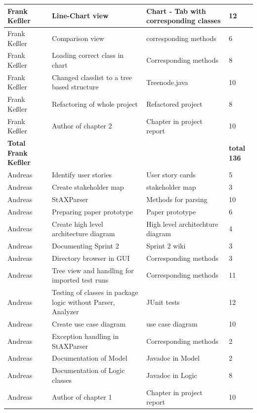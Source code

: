 \begin{longtable}{|p{}||p{}|p{}|p{}|}
    \hline
    Frank Keßler & Line-Chart view & Chart - Tab with corresponding classes & 12 \\ 
    \hline
    Frank Keßler & Comparison view & corresponding methods & 6\\
    \hline
    Frank Keßler & Loading correct class in chart & Corresponding methods & 8 \\ 
    \hline
    Frank Keßler & Changed classlist to a tree based structure & Treenode.java & 10 \\ 
    \hline
    Frank Keßler & Refactoring of whole project & Refactored project & 8 \\ 
    \hline
    Frank Keßler & Author of chapter 2 & Chapter in project report & 10 \\ 
    \hline
    \hline 
    \textbf{Total \newline Frank Keßler} & & & \textbf{total 136}   \\
    \hline
    \hline
    Andreas & Identify user stories & User story cards & 5 \\
    \hline
    Andreas & Create stakeholder map & stakeholder map & 3 \\ 
    \hline
    Andreas & StAXParser & Methods for parsing & 10 \\ 
    \hline
    Andreas & Preparing paper prototype & Paper prototype & 6 \\
    \hline
    Andreas & Create high level architecture diagram & High level architechture diagram & 4 \\ 
    \hline
    Andreas & Documenting Sprint 2 & Sprint 2 wiki & 3 \\ 
    \hline 
    Andreas & Directory browser in GUI & Corresponding methods & 3 \\ 
    \hline
    Andreas & Tree view and handling for imported test runs & Corresponding methods & 11 \\ 
    \hline
    Andreas & Testing of classes in package logic without Parser, Analyzer & JUnit tests & 12 \\ 
    \hline 
    Andreas & Create use case diagram & use case diagram & 10 \\ 
    \hline
    Andreas & Exception handling in StAXParser & Corresponding methods & 2 \\ 
    \hline
    Andreas & Documentation of Model & Javadoc in Model & 2 \\ 
    \hline
    Andreas & Documentation of Logic classes & Javadoc in Logic & 8 \\ 
    \hline
    Andreas & Author of chapter 1 & Chapter in project report & 10 \\ 

\end{longtable}

